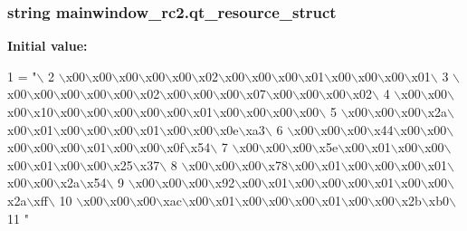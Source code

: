 \subsubsection[{qt\+\_\+resource\+\_\+struct}]{\setlength{\rightskip}{0pt plus 5cm}string mainwindow\+\_\+rc2.\+qt\+\_\+resource\+\_\+struct}\label{namespacemainwindow__rc2_a1d9866793d9f2f338fa83c8485519a98}
{\bfseries Initial value\+:}
\begin{DoxyCode}
1 = \textcolor{stringliteral}{"\(\backslash\)}
2 \textcolor{stringliteral}{\(\backslash\)x00\(\backslash\)x00\(\backslash\)x00\(\backslash\)x00\(\backslash\)x00\(\backslash\)x02\(\backslash\)x00\(\backslash\)x00\(\backslash\)x00\(\backslash\)x01\(\backslash\)x00\(\backslash\)x00\(\backslash\)x00\(\backslash\)x01\(\backslash\)}
3 \textcolor{stringliteral}{\(\backslash\)x00\(\backslash\)x00\(\backslash\)x00\(\backslash\)x00\(\backslash\)x00\(\backslash\)x02\(\backslash\)x00\(\backslash\)x00\(\backslash\)x00\(\backslash\)x07\(\backslash\)x00\(\backslash\)x00\(\backslash\)x00\(\backslash\)x02\(\backslash\)}
4 \textcolor{stringliteral}{\(\backslash\)x00\(\backslash\)x00\(\backslash\)x00\(\backslash\)x10\(\backslash\)x00\(\backslash\)x00\(\backslash\)x00\(\backslash\)x00\(\backslash\)x00\(\backslash\)x01\(\backslash\)x00\(\backslash\)x00\(\backslash\)x00\(\backslash\)x00\(\backslash\)}
5 \textcolor{stringliteral}{\(\backslash\)x00\(\backslash\)x00\(\backslash\)x00\(\backslash\)x2a\(\backslash\)x00\(\backslash\)x01\(\backslash\)x00\(\backslash\)x00\(\backslash\)x00\(\backslash\)x01\(\backslash\)x00\(\backslash\)x00\(\backslash\)x0e\(\backslash\)xa3\(\backslash\)}
6 \textcolor{stringliteral}{\(\backslash\)x00\(\backslash\)x00\(\backslash\)x00\(\backslash\)x44\(\backslash\)x00\(\backslash\)x00\(\backslash\)x00\(\backslash\)x00\(\backslash\)x00\(\backslash\)x01\(\backslash\)x00\(\backslash\)x00\(\backslash\)x0f\(\backslash\)x54\(\backslash\)}
7 \textcolor{stringliteral}{\(\backslash\)x00\(\backslash\)x00\(\backslash\)x00\(\backslash\)x5e\(\backslash\)x00\(\backslash\)x01\(\backslash\)x00\(\backslash\)x00\(\backslash\)x00\(\backslash\)x01\(\backslash\)x00\(\backslash\)x00\(\backslash\)x25\(\backslash\)x37\(\backslash\)}
8 \textcolor{stringliteral}{\(\backslash\)x00\(\backslash\)x00\(\backslash\)x00\(\backslash\)x78\(\backslash\)x00\(\backslash\)x01\(\backslash\)x00\(\backslash\)x00\(\backslash\)x00\(\backslash\)x01\(\backslash\)x00\(\backslash\)x00\(\backslash\)x2a\(\backslash\)x54\(\backslash\)}
9 \textcolor{stringliteral}{\(\backslash\)x00\(\backslash\)x00\(\backslash\)x00\(\backslash\)x92\(\backslash\)x00\(\backslash\)x01\(\backslash\)x00\(\backslash\)x00\(\backslash\)x00\(\backslash\)x01\(\backslash\)x00\(\backslash\)x00\(\backslash\)x2a\(\backslash\)xff\(\backslash\)}
10 \textcolor{stringliteral}{\(\backslash\)x00\(\backslash\)x00\(\backslash\)x00\(\backslash\)xac\(\backslash\)x00\(\backslash\)x01\(\backslash\)x00\(\backslash\)x00\(\backslash\)x00\(\backslash\)x01\(\backslash\)x00\(\backslash\)x00\(\backslash\)x2b\(\backslash\)xb0\(\backslash\)}
11 \textcolor{stringliteral}{"}
\end{DoxyCode}
